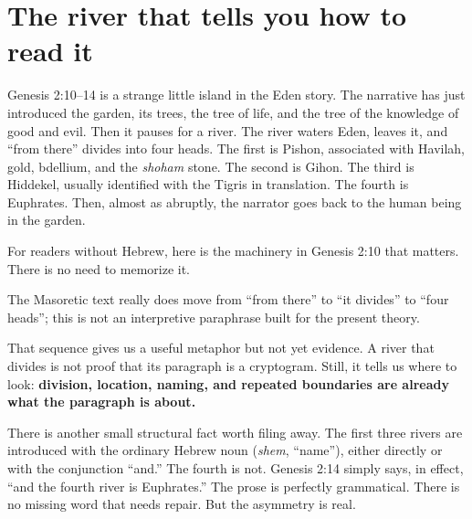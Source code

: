 \section*{The river that tells you how to read it}

Genesis 2:10--14 is a strange little island in the Eden story. The narrative has just introduced the garden, its trees, the tree of life, and the tree of the knowledge of good and evil. Then it pauses for a river. The river waters Eden, leaves it, and ``from there'' divides into four heads. The first is Pishon, associated with Havilah, gold, bdellium, and the \textit{shoham} stone. The second is Gihon. The third is Hiddekel, usually identified with the Tigris in translation. The fourth is Euphrates. Then, almost as abruptly, the narrator goes back to the human being in the garden.\cite{MasoreticGenesis}

For readers without Hebrew, here is the machinery in Genesis 2:10 that matters. There is no need to memorize it.


The Masoretic text really does move from ``from there'' to ``it divides'' to ``four heads''; this is not an interpretive paraphrase built for the present theory.\cite{MasoreticGenesis}

That sequence gives us a useful metaphor but not yet evidence. A river that divides is not proof that its paragraph is a cryptogram. Still, it tells us where to look: \textbf{division, location, naming, and repeated boundaries are already what the paragraph is about.}

There is another small structural fact worth filing away. The first three rivers are introduced with the ordinary Hebrew noun  (\textit{shem}, ``name''), either directly or with the conjunction ``and.'' The fourth is not. Genesis 2:14 simply says, in effect, ``and the fourth river is Euphrates.'' The prose is perfectly grammatical. There is no missing word that needs repair. But the asymmetry is real.\cite{MasoreticGenesis}

